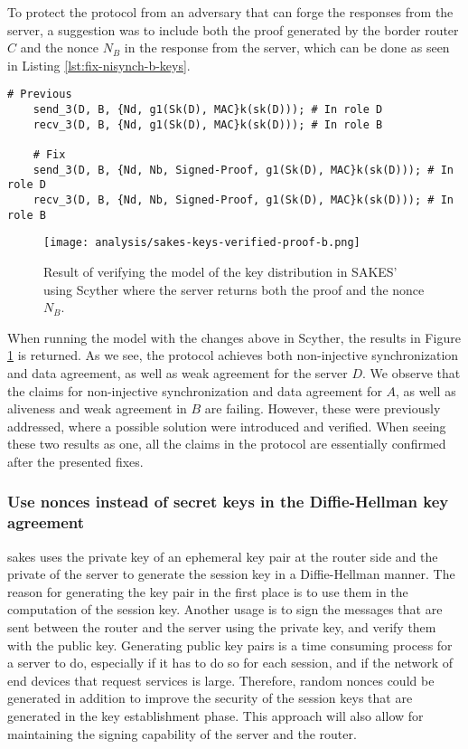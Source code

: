 To protect the protocol from an adversary that can forge the responses from the server, a suggestion was to include both the proof generated by the border router $C$ and the nonce $N_B$ in the response from the server, which can be done as seen in Listing \ref{lst:fix-nisynch-b-keys}.

\newpage

\begin{lstlisting}[caption={Fix to the SAKES protocol to provide authentication of the remote server D to the router B in the key establishment phase.}, label={lst:fix-nisynch-b-keys}]
	# Previous
	send_3(D, B, {Nd, g1(Sk(D), MAC}k(sk(D))); # In role D
	recv_3(D, B, {Nd, g1(Sk(D), MAC}k(sk(D))); # In role B

	# Fix
	send_3(D, B, {Nd, Nb, Signed-Proof, g1(Sk(D), MAC}k(sk(D))); # In role D
	recv_3(D, B, {Nd, Nb, Signed-Proof, g1(Sk(D), MAC}k(sk(D))); # In role B
\end{lstlisting}


\begin{figure}[H]
	\centering
	\texttt{[image: analysis/sakes-keys-verified-proof-b.png]}
	\caption{Result of verifying the model of the key distribution in SAKES' using Scyther where the server returns both the proof and the nonce $N_B$.}
	\label{fig:sakes-fix-verified-keys-b-proof}
\end{figure}

When running the model with the changes above in Scyther, the results in Figure \ref{fig:sakes-fix-verified-keys-b-proof} is returned. As we see, the protocol achieves both non-injective synchronization and data agreement, as well as weak agreement for the server $D$. We observe that the claims for non-injective synchronization and data agreement for $A$, as well as aliveness and weak agreement in $B$ are failing. However, these were previously addressed, where a possible solution were introduced and verified. When seeing these two results as one, all the claims in the protocol are essentially confirmed after the presented fixes.


\subsubsection{Use nonces instead of secret keys in the Diffie-Hellman key agreement}

\gls{sakes} uses the private key of an ephemeral key pair at the router side and the private of the server to generate the session key in a Diffie-Hellman manner. The reason for generating the key pair in the first place is to use them in the computation of the session key. Another usage is to sign the messages that are sent between the router and the server using the private key, and verify them with the public key. Generating public key pairs is a time consuming process for a server to do, especially if it has to do so for each session, and if the network of end devices that request services is large. Therefore, random nonces could be generated in addition to improve the security of the session keys that are generated in the key establishment phase. This approach will also allow for maintaining the signing capability of the server and the router.

